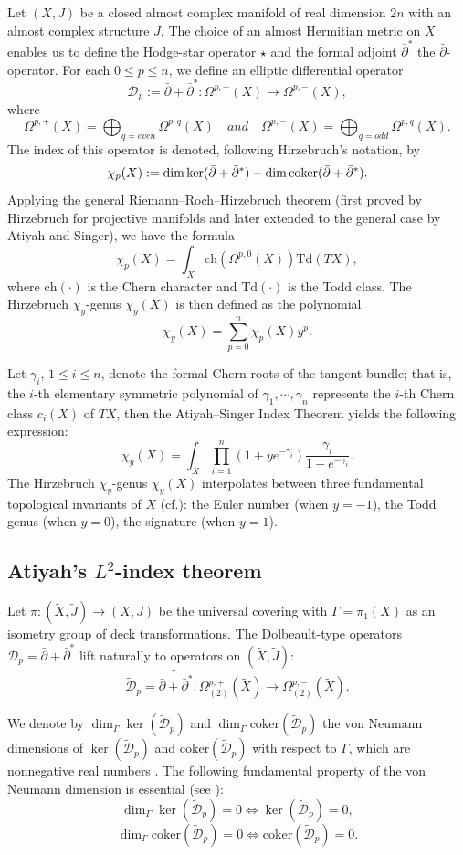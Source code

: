 \documentclass[12pt, twoside]{article}
\theoremstyle{definition}
\numberwithin{equation}{section}
\def\Om{\Omega}
\def\pa{\partial}
\begin{document}
Let $(X,J)$ be a closed almost complex manifold of real dimension $2n$ with an almost complex structure $J$.
The choice of an almost Hermitian metric on $X$ enables us to define the Hodge-star operator $\star$ and the formal adjoint $\bar{\pa}^{\ast}$ the $\bar{\pa}$-operator. For each $0\leq p\leq n$,  
we define an elliptic differential operator
\[\mathcal{D}_{p}:=\bar{\pa}+\bar{\pa}^{\ast}:\Om^{p,+}(X)\rightarrow\Om^{p,-}(X), \]
where 
\[\Om^{p,+}(X)=\bigoplus_{q=even}\Om^{p,q}(X)\quad and\quad \Om^{p,-}(X)=\bigoplus_{q=odd}\Om^{p,q}(X). \]
The index of this operator is denoted, following Hirzebruch's notation, by
\[ \chi_{p}(X):= \dim\ker(\bar{\pa}+\bar{\pa}^{\ast})-\dim{\rm{coker}}(\bar{\pa}+\bar{\pa}^{\ast}).\]
Applying the general Riemann--Roch--Hirzebruch theorem (first proved by Hirzebruch for projective manifolds and later extended to the general case by Atiyah and Singer),
we have the formula
\[ \chi_{p}(X)=\int_{X}\mathrm{ch}(\Om^{p,0}(X))\mathrm{Td}(TX),\]
where $\mathrm{ch}(\cdot)$ is the Chern character and $\mathrm{Td}(\cdot)$ is the Todd class. 
The Hirzebruch $\chi_{y}$-genus  $\chi_{y}(X)$ is then defined as the polynomial
\[ \chi_{y}(X)=\sum_{p=0}^{n}\chi_{p}(X)y^{p}.\]

Let $\gamma_{i}$, $1\leq i\leq n$, denote the formal Chern roots of the tangent bundle; that is, the $i$-th elementary symmetric polynomial of $\gamma_{1},\cdots,\gamma_{n}$ represents the $i$-th Chern class $c_{i}(X)$ of
$TX$, then the Atiyah--Singer Index Theorem yields the following expression:
\[\chi_{y}(X)=\int_{X}\prod_{i=1}^{n}(1+ye^{-\gamma_{i}})\frac{\gamma_{i}}{1-e^{-\gamma_{i}}}.\]
The Hirzebruch $\chi_{y}$-genus $\chi_{y}(X)$ interpolates between three fundamental topological invariants of $X$ (cf.\cite{Huy}): the Euler number (when $y=-1$), the Todd genus (when $y=0$), the signature (when $y=1$). 
\subsection{Atiyah's $L^{2}$-index theorem}

Let $\pi:(\tilde{X},\tilde{J})\rightarrow(X,J)$ be the universal covering with $\Gamma=\pi_{1}(X)$ as an isometry group of deck transformations. 
The Dolbeault-type operators $\mathcal{D}_{p}=\bar{\pa}+\bar{\pa}^{\ast}$ lift naturally to operators on $(\tilde{X},\tilde{J})$:
\[\tilde{\mathcal{D}}_{p}=\widetilde{\bar{\pa}+\bar{\pa}^{\ast}}:\Om^{p,+}_{(2)}(\tilde{X})\rightarrow\Om^{p,-}_{(2)}(\tilde{X}).\]

We denote by $\dim_{\Gamma}\ker(\tilde{\mathcal{D}}_{p})$ and $\dim_{\Gamma}\mathrm{coker}(\tilde{\mathcal{D}}_{p})$ 
the von Neumann dimensions of $\ker(\tilde{\mathcal{D}}_{p})$ and  $\mathrm{coker}(\tilde{\mathcal{D}}_{p})$ 
with respect to $\Gamma$, which are nonnegative real numbers \cite{Ati,CG,Luck}. 
The following fundamental property of the von Neumann dimension is essential (see \cite[Theorem 1.12]{Luck}):
\[ \dim_{\Gamma}\ker(\tilde{\mathcal{D}}_{p})=0\Leftrightarrow \ker(\tilde{\mathcal{D}}_{p})=0 ,\]
\[ \dim_{\Gamma}\mathrm{coker}(\tilde{\mathcal{D}}_{p})=0\Leftrightarrow \mathrm{coker}(\tilde{\mathcal{D}}_{p})=0.\]
\end{document}
